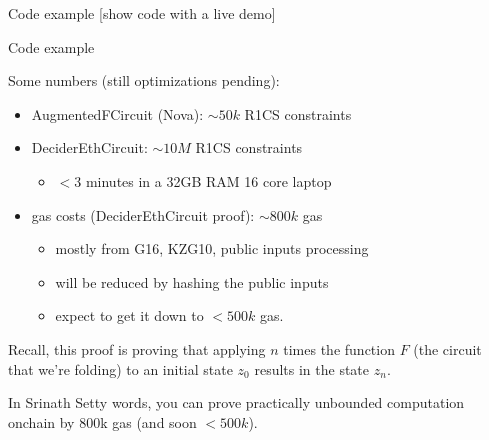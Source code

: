 \documentclass[t]{beamer}
\begin{document}
\begin{frame}{Code example}
  [show code with a live demo]
\end{frame}

\begin{frame}{Code example}
  \footnotesize{
  Some numbers (still optimizations pending):
  \begin{itemize}
  \item AugmentedFCircuit (Nova): $\sim 50k$ R1CS constraints
  \item DeciderEthCircuit: $\sim 10M$ R1CS constraints
  \begin{itemize}
    \item $<3$ minutes in a 32GB RAM 16 core laptop
  \end{itemize}
  \item gas costs (DeciderEthCircuit proof): $\sim 800k$ gas
  \begin{itemize}
    \item mostly from G16, KZG10, public inputs processing
    \item will be reduced by hashing the public inputs
    \item expect to get it down to $< 500k$ gas.
  \end{itemize}
  \end{itemize}
  }

  \vspace{0.6cm}

  Recall, this proof is proving that applying $n$ times the function $F$ (the circuit that we're folding) to an initial state $z_0$ results in the state $z_n$.

  \vspace{0.4cm}

  In Srinath Setty words, you can prove practically unbounded computation onchain by 800k gas (and soon $< 500k$).
\end{frame}
\end{document}
